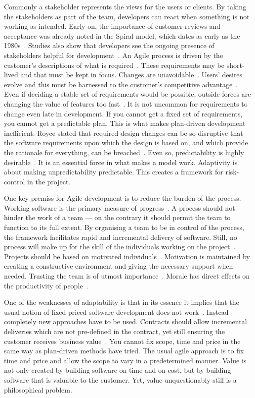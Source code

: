 \documentclass[english]{tktltiki2}
\begin{document}
Commonly a stakeholder represents the views for the users or clients. By taking the stakeholders as part of the team, developers can react when something is not working as intended. Early on, the importance of customer reviews and acceptance was already noted in the Spiral model, which dates as early as the 1980s~\cite{Boe88}. Studies also show that developers see the ongoing presence of stakeholders helpful for development~\cite{DD08}. An Agile process is driven by the customer’s descriptions of what is required~\cite{BBB01b}. These requirements may be short-lived and that must be kept in focus. Changes are unavoidable~\cite{Fow05}. Users’ desires evolve and this must be harnessed to the customer’s competitive advantage~\cite{BBB01b, Fow05}. Even if deciding a stable set of requirements would be possible, outside forces are changing the value of features too fast~\cite{Fow05}. It is not uncommon for requirements to change even late in development. If you cannot get a fixed set of requirements, you cannot get a predictable plan. This is what makes plan-driven development inefficient. Royce stated that required design changes can be so disruptive that the software requirements upon which the design is based on, and which provide the rationale for everything, can be breached~\cite{Roy70}. Even so, predictability is highly desirable~\cite{Fow05}. It is an essential force in what makes a model work. Adaptivity is about making unpredictability predictable. This creates a framework for risk-control in the project.

One key premiss for Agile development is to reduce the burden of the process. Working software is the primary measure of progress~\cite{BBB01b}. A process should not hinder the work of a team — on the contrary it should permit the team to function to its full extent. By organising a team to be in control of the process, the framework facilitates rapid and incremental delivery of software. Still, no process will make up for the skill of the individuals working on the project~\cite{Boe88, Fow05}. Projects should be based on motivated individuals~\cite{BBB01b}. Motivation is maintained by creating a constructive environment and giving the necessary support when needed. Trusting the team is of utmost importance~\cite{BBB01b}. Morale has direct effects on the productivity of people~\cite{Fow05, LTR14}.

One of the weaknesses of adaptability is that in its essence it implies that the usual notion of fixed-priced software development does not work~\cite{Pop02, TFR02, Fow05, HAB12}. Instead completely new approaches have to be used. Contracts should allow incremental deliveries which are not pre-defined in the contract, yet still ensuring the customer receives business value~\cite{Pop02}. You cannot fix scope, time and price in the same way as plan-driven methods have tried. The usual agile approach is to fix time and price and allow the scope to vary in a predetermined manner. Value is not only created by building software on-time and on-cost, but by building software that is valuable to the customer. Yet, value unquestionably still is a philosophical problem.
\end{document}
